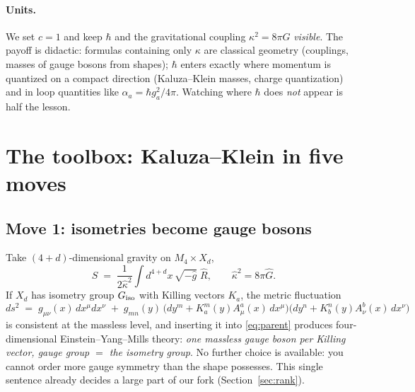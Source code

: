 \documentclass[11pt]{article}
\newcommand{\hb}{\hbar}
\begin{document}
\paragraph{Units.} We set $c=1$ and keep $\hb$ and the gravitational coupling
$\kappa^2 = 8\pi G$ \emph{visible}. The payoff is didactic: formulas containing only
$\kappa$ are classical geometry (couplings, masses of gauge bosons from shapes); $\hb$ enters
exactly where momentum is quantized on a compact direction (Kaluza--Klein masses, charge
quantization) and in loop quantities like $\alpha_a = \hb g_a^2/4\pi$. Watching where $\hb$
does \emph{not} appear is half the lesson.

\section{The toolbox: Kaluza--Klein in five moves}

\subsection{Move 1: isometries become gauge bosons}

Take $(4+d)$-dimensional gravity on $M_4\times X_d$,
\begin{equation}
S \;=\; \frac{1}{2\hat\kappa^2}\int d^{4+d}x\,\sqrt{-\hat g}\;\hat R ,
\qquad \hat\kappa^2 = 8\pi \hat G .
\label{eq:parent}
\end{equation}
If $X_d$ has isometry group $G_{\rm iso}$ with Killing vectors $K_a$, the metric fluctuation
\begin{equation}
ds^2 \;=\; g_{\mu\nu}(x)\,dx^\mu dx^\nu \;+\; g_{mn}(y)\,
\big(dy^m + K^m_a(y) A^a_\mu(x)\,dx^\mu\big)\big(dy^n + K^n_b(y) A^b_\nu(x)\,dx^\nu\big)
\label{eq:ansatz}
\end{equation}
is consistent at the massless level, and inserting it into \eqref{eq:parent} produces
four-dimensional Einstein--Yang--Mills theory: \emph{one massless gauge boson per Killing
vector, gauge group $=$ the isometry group}. No further choice is available: you cannot order
more gauge symmetry than the shape possesses. This single sentence already decides a large
part of our fork (Section~\ref{sec:rank}).
\end{document}
